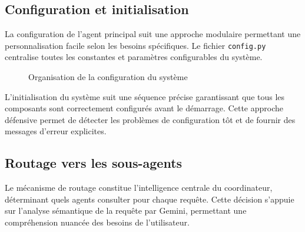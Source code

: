 \subsection{Configuration et initialisation}

La configuration de l'agent principal suit une approche modulaire permettant une personnalisation facile selon les besoins spécifiques. Le fichier \texttt{config.py} centralise toutes les constantes et paramètres configurables du système.

\begin{figure}[h]
\centering
{}
\caption{Organisation de la configuration du système}
\end{figure}

L'initialisation du système suit une séquence précise garantissant que tous les composants sont correctement configurés avant le démarrage. Cette approche défensive permet de détecter les problèmes de configuration tôt et de fournir des messages d'erreur explicites.

\subsection{Routage vers les sous-agents}

Le mécanisme de routage constitue l'intelligence centrale du coordinateur, déterminant quels agents consulter pour chaque requête. Cette décision s'appuie sur l'analyse sémantique de la requête par Gemini, permettant une compréhension nuancée des besoins de l'utilisateur.

